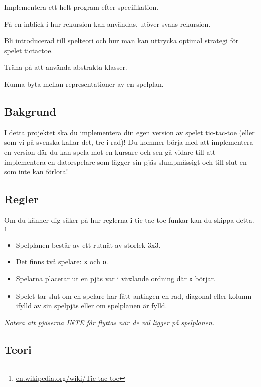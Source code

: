 

\begin{Goals}
	\item Implementera ett helt program efter specifikation.
	\item Få en inblick i hur rekursion kan användas, utöver svans-rekursion.
	\item Bli introducerad till spelteori och hur man kan uttrycka optimal strategi för spelet tictactoe.
	\item Träna på att använda abstrakta klasser.
	\item Kunna byta mellan representationer av en spelplan.
\end{Goals}

\subsection{Bakgrund}
I detta projektet ska du implementera din egen version av spelet tic-tac-toe (eller som vi på svenska kallar det, tre i rad)! Du kommer börja med att implementera en version där du kan spela mot en kursare och sen gå vidare till att implementera en datorspelare som lägger sin pjäs slumpmässigt och till slut en som inte kan förlora!

\subsection{Regler}
Om du känner dig säker på hur reglerna i tic-tac-toe funkar kan du skippa detta. \footnote{\href{https://en.wikipedia.org/wiki/Tic-tac-toe }{en.wikipedia.org/wiki/Tic-tac-toe}}
\begin{itemize}
	\item Spelplanen består av ett rutnät av storlek 3x3.
	\item Det finns två spelare: \texttt{x} och \texttt{o}.
	\item Spelarna placerar ut en pjäs var i växlande ordning där \texttt{x} börjar.
	\item Spelet tar slut om en spelare har fått antingen en rad, diagonal eller kolumn ifylld av sin spelpjäs eller om spelplanen är fylld.
\end{itemize}
\textit{Notera att pjäserna INTE får flyttas när de väl ligger på spelplanen.}

\subsection{Teori}

